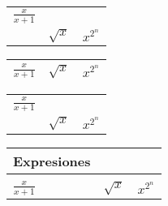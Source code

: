 \documentclass[letterpaper, 12pt]{article}
\begin{document}
\begin{tabular}{l l l}\hline
$\displaystyle\frac{x}{x+1}$\\
& $\sqrt{x}$
& $x^{2^n}$\\ \hline
\end{tabular}

\begin{tabular}{l l l}\toprule
$\displaystyle \frac{x}{x+1}$ & $\sqrt{x}$ & $x^{2^n}$\\ \bottomrule
\end{tabular}

\begin{tabular}{l l l@{\vrule height 15pt depth 10pt width 0pt}}\hline
$\displaystyle \frac{x}{x+1}$ \\
& $\sqrt{x}$
& $x^{2^n}$\\ \hline
\end{tabular}

\begin{tabular}{l l l} \hline
Expresiones & & \\ \hline
& & \\[-8pt]
$\displaystyle \frac{x}{x+1}$ & $\sqrt{x}$ & $x^{2^n}$ \\[8pt]\hline
\end{tabular}
\end{document}
